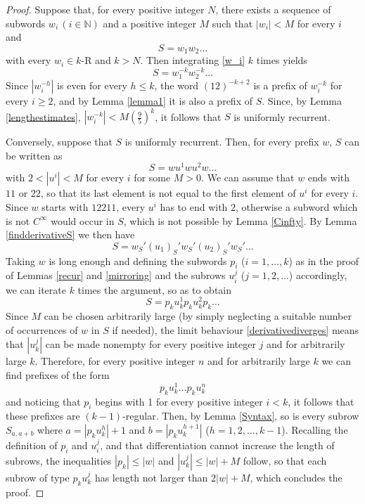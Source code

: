 \documentclass[10pt,a4paper]{article}
\begin{document}
\begin{proof}
Suppose that, for every positive integer $N$, there exists a sequence of subwords $w_i\, (i\in \mathbb{N})$ and a positive integer $M$ such that $|w_i|<M$ for every $i$ and 
\begin{equation}
S=w_1w_2\dots 
\label{w_i}
\end{equation}
with every $w_i\in k$-R and $k>N$. Then integrating \eqref{w_i} $k$ times yields
\begin{equation*}
S=w_1^{-k}w_2^{-k}\dots 
\end{equation*} 
Since $|w_i^{-h}|$ is even for every $h\le k$, the word $(12)^{-k+2}$ is a prefix of $w_i^{-k}$ for every $i\ge 2$, and by Lemma \ref{lemma1} it is also a prefix of $S$. Since, by Lemma \ref{lengthestimates}, $|w_i^{-k}|<M\left(\frac{9}{5}\right)^k$, it follows that $S$ is uniformly recurrent.

Conversely, suppose that $S$ is uniformly recurrent. Then, for every prefix $w$, $S$ can be written as
\begin{equation}
S=wu^1wu^2w\dots 
\label{unif}
\end{equation} 
with $2<|u^i|<M$ for every $i$ for some $M>0$. We can assume that $w$ ends with $11$ or $22$, so that its last element is not equal to the first element of $u^i$ for every $i$. Since $w$ starts with $12211$, every $u^i$ has to end with $2$, otherwise a subword which is not $C^{\infty}$ would occur in $S$, which is not possible by Lemma \ref{Cinfty}. By Lemma \ref{findderivativeS} we then have
\begin{equation*}
S=w_S'(u_1)_S'w_S'(u_2)_S'w_S'\dots 
\end{equation*}
Taking $w$ is long enough and defining the subwords $p_i$ ($i=1,\dots,k$) as in the proof of Lemmas \ref{recur} and \ref{mirroring} and the subrows $u_{i}^j$ ($j=1,2,\dots$) accordingly, we can iterate $k$ times the argument, so as to obtain
\begin{equation*}
S=p_ku_k^1p_ku_k^2 p_k\dots 
\end{equation*}
Since $M$ can be chosen arbitrarily large (by simply neglecting a suitable number of occurrences of $w$ in $S$ if needed), the limit behaviour \eqref{derivativediverges} means that $|u_k^j|$ can be made nonempty for every positive integer $j$ and for arbitrarily large $k$. Therefore, for every positive integer $n$ and for arbitrarily large $k$ we can find prefixes of the form $$p_ku_k^1\dots p_ku_k^n$$ and noticing that $p_i$ begins with 1 for every positive integer $i<k$, it follows that these prefixes are $(k-1)$-regular. Then, by Lemma \ref{Syntax}, so is every subrow $S_{a,a+b}$ where $a=|p_{k}u_{k}^h|+1$ and $b=|p_{k}u_{k}^{h+1}|$ ($ h=1,2,\dots, k-1$). Recalling the definition of $p_i$ and $u_i^j$, and that differentiation cannot increase the length of subrows, the inequalities $|p_{k}|\le |w|$ and $|u_{k}^j|\le |w|+M$ follow, so that each subrow of type $p_{k}u_{k}^j$ has length not larger than $2|w|+M$, which concludes the proof.  
\end{proof}
\end{document}
